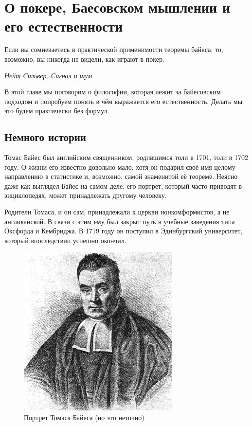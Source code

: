 
\chapter[О естественности байесовского мышления]{О покере, Баесовском мышлении и его естественности}


\epigraph{Если вы сомневаетесь в практической применимости теоремы байеса, то, возможно, вы никогда не видели, как играют в покер.}{\textit{Нейт Сильвер. Сигнал и шум }}

В этой главе мы поговорим о философии, которая лежит за байесовским подходом и попробуем понять в чём выражается его естественность. Делать мы это будем практически без формул. 


\section{Немного истории} 

Томас Байес был английским священником, родившимся толи в 1701, толи в 1702 году. О жизни его известно довольно мало, хотя он подарил своё имя целому направлению в статистике и, возможно, самой знаменитой её теореме.  Неясно даже как выглядел Байес на самом деле, его портрет, который часто приводят в энциклопедях, может принадлежать другому человеку.

Родители Томаса, и он сам,  принадлежали к церкви нонкомформистов, а не англиканской. В связи с этим ему был закрыт путь в учебные заведения типа Оксфорда и Кембриджа. В 1719 году он поступил в Эдинбургский университет, который впоследствии успешно окончил.

\begin{figure}
	\centering \includegraphics[width=0.8\linewidth]{images/bayes.png}
	\caption{Портрет Томаса Байеса (но это неточно)}
\end{figure}

